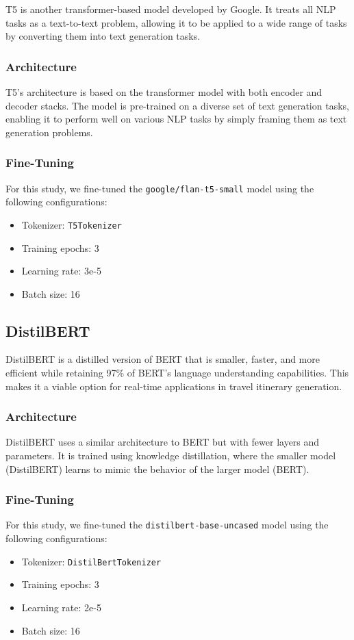 \documentclass[conference]{IEEEtran}
\begin{document}
T5 is another transformer-based model developed by Google. It treats all NLP tasks as a text-to-text problem, allowing it to be applied to a wide range of tasks by converting them into text generation tasks.

\subsubsection{Architecture}
T5's architecture is based on the transformer model with both encoder and decoder stacks. The model is pre-trained on a diverse set of text generation tasks, enabling it to perform well on various NLP tasks by simply framing them as text generation problems.

\subsubsection{Fine-Tuning}
For this study, we fine-tuned the \texttt{google/flan-t5-small} model using the following configurations:
\begin{itemize}
    \item Tokenizer: \texttt{T5Tokenizer}
    \item Training epochs: 3
    \item Learning rate: 3e-5
    \item Batch size: 16
\end{itemize}

\subsection{DistilBERT}

DistilBERT is a distilled version of BERT that is smaller, faster, and more efficient while retaining 97\% of BERT's language understanding capabilities. This makes it a viable option for real-time applications in travel itinerary generation.

\subsubsection{Architecture}
DistilBERT uses a similar architecture to BERT but with fewer layers and parameters. It is trained using knowledge distillation, where the smaller model (DistilBERT) learns to mimic the behavior of the larger model (BERT).

\subsubsection{Fine-Tuning}
For this study, we fine-tuned the \texttt{distilbert-base-uncased} model using the following configurations:
\begin{itemize}
    \item Tokenizer: \texttt{DistilBertTokenizer}
    \item Training epochs: 3
    \item Learning rate: 2e-5
    \item Batch size: 16
\end{itemize}
\end{document}
